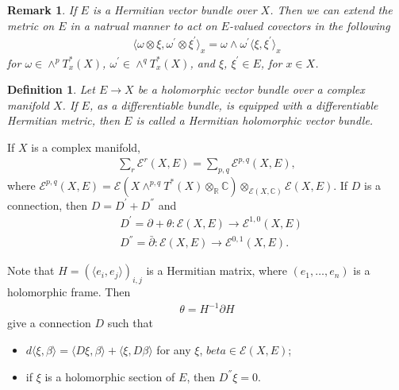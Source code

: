 \documentclass[a4paper,10pt]{amsart}
\newtheorem{definition}{Definition}[section]
\newtheorem{remark}{Remark}[section]
\newcommand{\C}{\mathbb C} %
\newcommand{\R}{\mathbb R}  %
\newcommand{\E}{\mathcal E}
\begin{document}
\begin{remark}
  If $E$ is a Hermitian vector bundle over $X$. Then we can extend 
  the metric on $E$ in a natrual manner to act on $E$-valued covectors 
  in the following
  \begin{align*}
      \langle \omega \otimes \xi, \omega^{'}\otimes \xi^{'} \rangle_{x}
      = \omega \wedge \omega^{'} \langle \xi, \xi^{'} \rangle_{x}
  \end{align*}
  for $\omega \in \wedge^{p}T^{*}_{x}(X)$, $\omega^{'} \in 
  \wedge^{q}T^{*}_{x}(X)$, and $\xi$, $\xi^{'} \in E$, for
  $x \in X$.
\end{remark}

\begin{definition}
Let $E \rightarrow X$ be a holomorphic vector
bundle over a complex manifold $X$. If $E$, as a differentiable
bundle, is equipped with a differentiable Hermitian metric, then
$E$ is called a Hermitian holomorphic vector bundle.
\end{definition}

If $X$ is a complex manifold,
\begin{align*}
    \sum_{r}\E^{r}(X, E) = \sum_{p,q}\E^{p,q}(X,E), 
\end{align*}
where $\E^{p,q}(X,E) = \E(X \wedge^{p,q}T^{*}(X) \otimes_{\R} \C)
\otimes_{\E(X, \C)} \E(X, E)$.
If $D$ is a connection, then 
$D = D^{'} + D^{''}$ and
\begin{align*}
    & D^{'} = \partial + \theta: \E(X, E) \rightarrow \E^{1,0}(X, E) \\
    & D^{''} = \bar{\partial} : \E(X, E) \rightarrow \E^{0,1}(X, E).
\end{align*}

Note that $H = (\langle e_{i}, e_{j} \rangle)_{i,j}$ is a Hermitian matrix,
where $(e_1, \ldots, e_n)$ is a holomorphic frame. Then
\begin{align*}
    \theta = H^{-1}\partial H
\end{align*}
give a connection $D$ such that
\begin{itemize}
    \item $d \langle \xi, \beta \rangle = \langle D\xi, \beta \rangle
        + \langle \xi, D \beta \rangle$ for any $\xi$, $beta \in 
        \E(X, E)$;
    \item if $\xi$ is a holomorphic section of $E$, then $D^{''}\xi = 0$.
\end{itemize}
\end{document}

